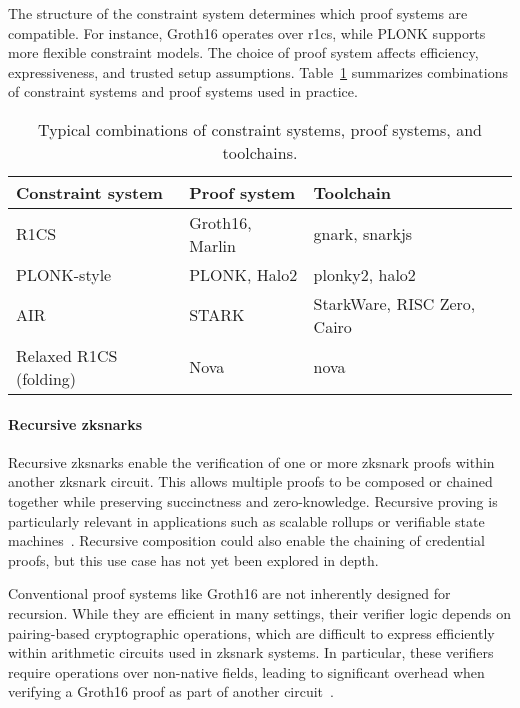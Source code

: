 The structure of the constraint system determines which proof systems are compatible. For instance, Groth16 operates over \acrshort{r1cs}, while PLONK supports more flexible constraint models. The choice of proof system affects efficiency, expressiveness, and trusted setup assumptions. Table~\ref{tab:constraint-proof-systems} summarizes combinations of constraint systems and proof systems used in practice.

\begin{table}[htbp]
	\centering
	\begin{tabular}{l l l}
		\toprule
		\textbf{Constraint system} & \textbf{Proof system} & \textbf{Toolchain} \\
		\midrule
		R1CS                     & Groth16, Marlin       & gnark, snarkjs \\
		PLONK-style              & PLONK, Halo2          & plonky2, halo2 \\
		AIR                      & STARK                 & StarkWare, RISC Zero, Cairo \\
		Relaxed R1CS (folding)   & Nova                  & nova \\
		\bottomrule
	\end{tabular}
	\caption{Typical combinations of constraint systems, proof systems, and toolchains.}
	\label{tab:constraint-proof-systems}
\end{table}

\paragraph{Recursive \acrshort{zksnark}s}
Recursive \acrshort{zksnark}s enable the verification of one or more \acrshort{zksnark} proofs within another \acrshort{zksnark} circuit. This allows multiple proofs to be composed or chained together while preserving succinctness and zero-knowledge. Recursive proving is particularly relevant in applications such as scalable rollups or verifiable state machines~\cite{cryptoeprint:2019/1021, cryptoeprint:2021/370}. Recursive composition could also enable the chaining of credential proofs, but this use case has not yet been explored in depth.

Conventional proof systems like Groth16 are not inherently designed for recursion. While they are efficient in many settings, their verifier logic depends on pairing-based cryptographic operations, which are difficult to express efficiently within arithmetic circuits used in \acrshort{zksnark} systems. In particular, these verifiers require operations over non-native fields, leading to significant overhead when verifying a Groth16 proof as part of another circuit~\cite{cryptoeprint:2022/1286}.

